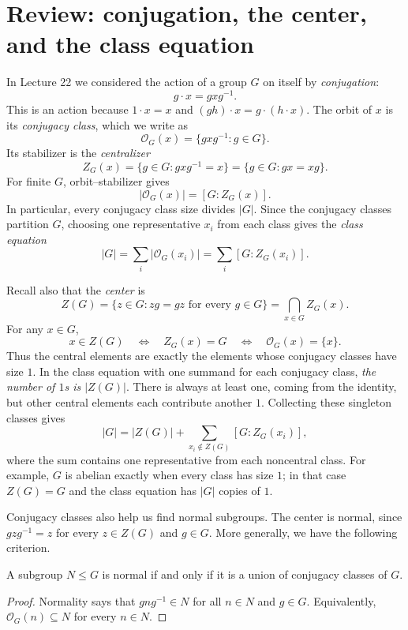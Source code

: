\documentclass[reqno,11pt]{amsart}
\begin{document}
\raggedbottom
\makelecturetitle

\section{Review: conjugation, the center, and the class equation}

In Lecture 22 we considered the action of a group $G$ on itself by
\emph{conjugation}:
\[
  g\cdot x=gxg^{-1}.
\]
This is an action because $1\cdot x=x$ and
$(gh)\cdot x=g\cdot(h\cdot x)$. The orbit of $x$ is its
\emph{conjugacy class}, which we write as
\[
  \mathcal{O}_G(x)=\{gxg^{-1}:g\in G\}.
\]
Its stabilizer is the \emph{centralizer}
\[
  Z_G(x)=\{g\in G:gxg^{-1}=x\}
        =\{g\in G:gx=xg\}.
\]
For finite $G$, orbit--stabilizer gives
\[
  |\mathcal{O}_G(x)|=[G:Z_G(x)].
\]
In particular, every conjugacy class size divides $|G|$.
Since the conjugacy classes partition $G$, choosing one representative
$x_i$ from each class gives the \emph{class equation}
\[
  |G|=\sum_i|\mathcal{O}_G(x_i)|=\sum_i[G:Z_G(x_i)].
\]

Recall also that the \emph{center} is
\[
  Z(G)=\{z\in G:zg=gz\text{ for every }g\in G\}
      =\bigcap_{x\in G}Z_G(x).
\]
For any $x\in G$,
\[
  x\in Z(G)\quad\Longleftrightarrow\quad Z_G(x)=G
  \quad\Longleftrightarrow\quad\mathcal{O}_G(x)=\{x\}.
\]
Thus the central elements are exactly the elements whose conjugacy
classes have size $1$. In the class equation with one summand for
each conjugacy class, \emph{the number of $1$s is $|Z(G)|$}.
There is always at least one, coming from the identity, but other
central elements each contribute another $1$.
Collecting these singleton classes gives
\[
  |G|=|Z(G)|+\sum_{x_i\notin Z(G)}[G:Z_G(x_i)],
\]
where the sum contains one representative from each noncentral class.
For example, $G$ is abelian exactly when every class has size $1$;
in that case $Z(G)=G$ and the class equation has $|G|$ copies of $1$.

Conjugacy classes also help us find normal subgroups. The center is
normal, since $gzg^{-1}=z$ for every $z\in Z(G)$ and $g\in G$.
More generally, we have the following criterion.

\begin{proposition}\label{prop:normal-union}
A subgroup $N\leq G$ is normal if and only if it is a union of
conjugacy classes of $G$.
\end{proposition}
\begin{proof}
Normality says that $gng^{-1}\in N$ for all $n\in N$ and $g\in G$.
Equivalently, $\mathcal{O}_G(n)\subseteq N$ for every $n\in N$.
\end{proof}
\end{document}
